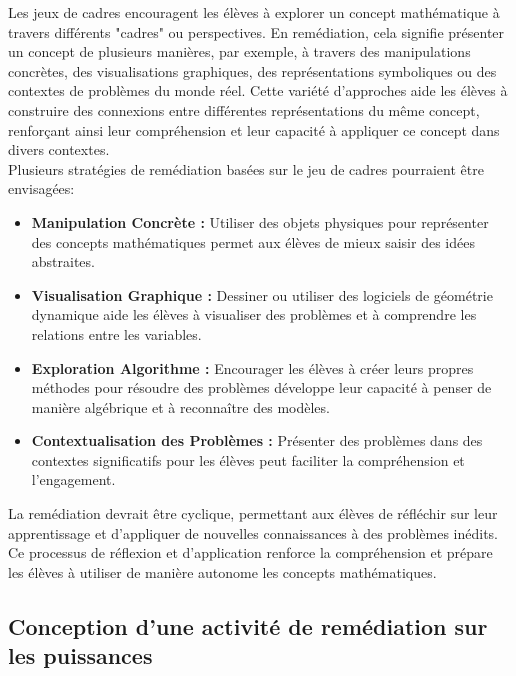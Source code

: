 Les jeux de cadres encouragent les élèves à explorer un concept mathématique à travers différents "cadres" ou perspectives.
En remédiation,
cela signifie présenter un concept de plusieurs manières,
par exemple,
à travers des manipulations concrètes,
des visualisations graphiques,
des représentations symboliques ou des contextes de problèmes du monde réel.
Cette variété d'approches aide les élèves à construire des connexions entre différentes représentations du même concept,
renforçant ainsi leur compréhension et leur capacité à appliquer ce concept dans divers contextes.\\

Plusieurs stratégies de remédiation basées sur le jeu de cadres pourraient être envisagées:
\begin{itemize}%
    \item \textbf{Manipulation Concrète :}
    Utiliser des objets physiques pour représenter des concepts mathématiques permet aux élèves de mieux saisir des idées abstraites.

    \item \textbf{Visualisation Graphique :}
    Dessiner ou utiliser des logiciels de géométrie dynamique aide les élèves à visualiser des problèmes et à comprendre les relations entre les variables.
    
    \item \textbf{Exploration Algorithme :}
    Encourager les élèves à créer leurs propres méthodes pour résoudre des problèmes développe leur capacité à penser de manière algébrique et à reconnaître des modèles.
    
    \item \textbf{Contextualisation des Problèmes :}
    Présenter des problèmes dans des contextes significatifs pour les élèves peut faciliter la compréhension et l'engagement.
\end{itemize}%

La remédiation devrait être cyclique,
permettant aux élèves de réfléchir sur leur apprentissage et d'appliquer de nouvelles connaissances à des problèmes inédits.
Ce processus de réflexion et d'application renforce la compréhension et prépare les élèves à utiliser de manière autonome les concepts mathématiques.

\subsection{Conception d'une activité de remédiation sur les puissances}

